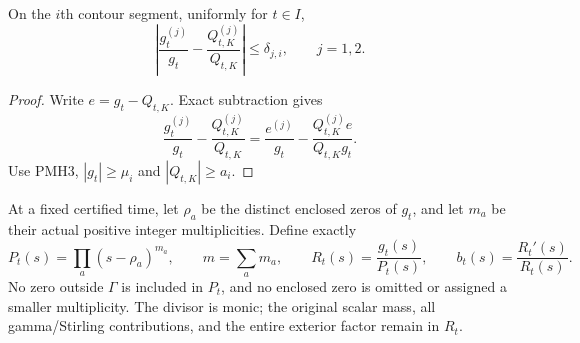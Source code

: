 \documentclass[11pt]{article}
\begin{document}
\begin{pmreceivertheorem}
\label{pmreceiver:PMH5}
On the $i$th contour segment, uniformly for $t\in I$,
\begin{equation}\label{pmreceiver:PMH5-ratio}
 \left|\frac{g_t^{(j)}}{g_t}-\frac{Q_{t,K}^{(j)}}{Q_{t,K}}\right|
 \le\delta_{j,i},\qquad j=1,2.
\end{equation}
\end{pmreceivertheorem}
\begin{proof}
Write $e=g_t-Q_{t,K}$. Exact subtraction gives
\[
 \frac{g_t^{(j)}}{g_t}-\frac{Q_{t,K}^{(j)}}{Q_{t,K}}
 =\frac{e^{(j)}}{g_t}
       -\frac{Q_{t,K}^{(j)}e}{Q_{t,K}g_t}.
\]
Use PMH3, $|g_t|\ge\mu_i$ and $|Q_{t,K}|\ge a_i$.
\end{proof}

At a fixed certified time, let $\rho_a$ be the distinct enclosed
zeros of $g_t$, and let $m_a$ be their actual positive integer
multiplicities. Define exactly
\begin{equation}\label{pmreceiver:PMH6-divisor}
 P_t(s)=\prod_a(s-\rho_a)^{m_a},\qquad
 m=\sum_am_a,\qquad R_t(s)=\frac{g_t(s)}{P_t(s)},\qquad
 b_t(s)=\frac{R_t'(s)}{R_t(s)}.
\end{equation}
No zero outside $\Gamma$ is included in $P_t$, and no enclosed zero
is omitted or assigned a smaller multiplicity. The divisor is
monic; the original scalar mass, all gamma/Stirling contributions,
and the entire exterior factor remain in $R_t$.
\end{document}
